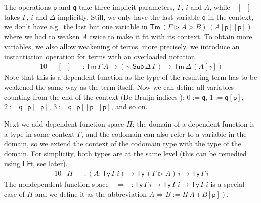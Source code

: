\documentclass[sigplan,10pt,anonymous,review]{acmart}\settopmatter{printfolios=true,printccs=false,printacmref=false}
\newcommand{\ra}{\rightarrow}
\newcommand{\Ra}{\Rightarrow}
\newcommand{\Ty}{\mathsf{Ty}}
\newcommand{\Tm}{\mathsf{Tm}}
\newcommand{\Sub}{\mathsf{Sub}}
\newcommand{\p}{\mathsf{p}}
\newcommand{\q}{\mathsf{q}}
\newcommand{\ext}{\mathop{\triangleright}}
\newcommand{\blank}{\mathord{\hspace{1pt}\text{--}\hspace{1pt}}} %
\newcommand{\Lift}{\mathsf{Lift}}
\begin{document}
The operations $\p$ and $\q$ take three implicit parameters, $\Gamma$,
$i$ and $A$, while $\blank[\blank]$ takes $\Gamma$, $i$ and $\Delta$
implicitly. Still, we only have the last variable $\q$ in the context,
we don't have e.g.\ the last but one variable in $\Tm\,(\Gamma\ext
A\ext B)\,(A[\p][\p])$ where we had to weaken $A$ twice to make it fit
with its context. To obtain more variables, we also allow weakening of
terms, more precisely, we introduce an instantiation operation for
terms with an overloaded notation.
\begin{alignat*}{10}
& \blank[\blank] && : \Tm\,\Gamma\,A\ra(\gamma:\Sub\,\Delta\,\Gamma)\ra\Tm\,\Delta\,(A[\gamma])
\end{alignat*}
Note that this is a dependent function as the type of the resulting
term has to be weakened the same way as the term itself. Now we can
define all variables counting from the end of the context (De Bruijn
indices \cite{debruijn}): $0 := \q$, $1 := \q[\p]$, $2 := \q[\p][\p]$,
$3 := \q[\p][\p][\p]$, and so on.

Next we add dependent function space $\Pi$: the domain of a dependent
function is a type in some context $\Gamma$, and the codomain can also
refer to a variable in the domain, so we extend the context of the
codomain type with the type of the domain. For simplicity, both types
are at the same level (this can be remedied using $\Lift$, see later).
\begin{alignat*}{10}
& \Pi && : (A:\Ty\,\Gamma\,i)\ra\Ty\,(\Gamma\ext A)\,i\ra\Ty\,\Gamma\,i
\end{alignat*}
The nondependent function space $\blank\Ra\blank :
\Ty\,\Gamma\,i\ra\Ty\,\Gamma\,i\ra\Ty\,\Gamma\,i$ is a special case of $\Pi$
and we define it as the abbreviation $A\Ra B := \Pi\,A\,(B[\p])$.
\end{document}
